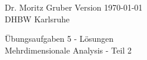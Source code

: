 




\vspace*{-20mm}
{
	\color{dhbwGray}
	Dr. Moritz Gruber	\hfill Version \today\\
	DHBW Karlsruhe\\
}

\vspace{10mm}
\begin{center}
	{
		{ \LARGE 	Übungsaufgaben 5 - Lösungen}\\[3mm]
		{\Large Mehrdimensionale Analysis - Teil 2}
	}
\end{center}

\vspace{5mm}



